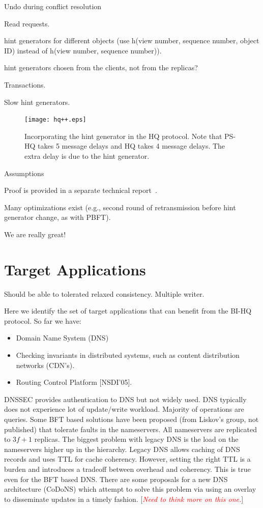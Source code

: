 \documentclass[twocolumn,10pt]{article}
\newcommand{\bihq}{BI-HQ\xspace}
\newcommand{\note}[1]{[\textcolor{red}{\textit{#1}}]}
\newcommand{\stitle}[1]{\vspace{2pt}{\bf #1:}}
\begin{document}
Undo during conflict resolution

Read requests.

hint generators for different objects (use h(view number, sequence
number, object ID) instead of h(view number, sequence number)).

hint generators chosen from the clients, not from the replicas?

Transactions.

Slow hint generators.


\begin{figure}
\centering
\texttt{[image: hq++.eps]}
\caption{Incorporating the hint generator in the HQ protocol. Note that PS-HQ
takes 5 message delays and HQ takes 4 message delays.  The extra delay is
due to the hint generator.}
\label{fig:pshq}
\end{figure}

Assumptions

Proof is provided in a separate technical report~\cite{}.

Many optimizations exist (e.g., second round of retransmission before
hint generator change, as with PBFT).



We are really great!


\fi





\section{Target Applications}
\label{sec:applications}

\stitle{Key characteristics} Should be able to tolerated relaxed consistency.
Multiple writer. 

\stitle{Application that can tolerate weak consistency}
Here we identify the set of target applications that can benefit from the \bihq
protocol. So far we have:
\begin{itemize}
\item{} Domain Name System (DNS)
\item{} Checking invariants in distributed systems, such as content distribution networks (CDN's).
\item{} Routing Control Platform [NSDI'05]. 
\end{itemize}

\stitle{DNS} DNSSEC provides authentication to DNS but not widely used. DNS typically does not experience lot
of update/write workload. Majority of operations are queries. Some BFT based solutions have been proposed 
(from Liskov's group, not published) that tolerate faults in the nameservers. All nameservers are replicated to 
$3f+1$ replicas. The biggest problem with legacy DNS is the load on the nameservers higher up in the hierarchy.
Legacy DNS allows caching of DNS records and uses TTL for cache coherency. However, setting the right TTL is a burden
and introduces a tradeoff between overhead and coherency. This is true even for the BFT based DNS. There are some
proposals for a new DNS architecture (CoDoNS) which attempt to solve this problem via using an overlay to disseminate
updates in a timely fashion. \note{Need to think more on this one.}
\end{document}
